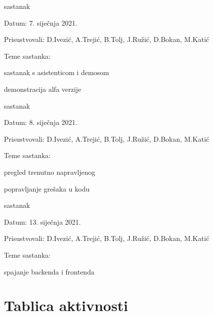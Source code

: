 \begin{packed_enum}
			\item  sastanak
			\item[] \begin{packed_item}
				\item Datum: 7. siječnja 2021.
				\item Prisustvovali: D.Ivezić, A.Trejić, B.Tolj, J.Ružić, D.Bokan, M.Katić
				\item Teme sastanka:
				\begin{packed_item}
					\item  sastanak s asistenticom i demosom
					\item  demonstracija alfa verzije
				\end{packed_item}
			\end{packed_item}
			
			\item  sastanak
			\item[] \begin{packed_item}
				\item Datum: 8. siječnja 2021.
				\item Prisustvovali: D.Ivezić, A.Trejić, B.Tolj, J.Ružić, D.Bokan, M.Katić
				\item Teme sastanka:
				\begin{packed_item}
					\item  pregled trenutno napravljenog
					\item  popravljanje grešaka u kodu
				\end{packed_item}
			\end{packed_item}
			
			\item  sastanak
			\item[] \begin{packed_item}
				\item Datum: 13. siječnja 2021.
				\item Prisustvovali: D.Ivezić, A.Trejić, B.Tolj, J.Ružić, D.Bokan, M.Katić
				\item Teme sastanka:
				\begin{packed_item}
					\item  spajanje backenda i frontenda
				\end{packed_item}
			\end{packed_item}
			
			
		\end{packed_enum}
		
		\eject
		\section*{Tablica aktivnosti}
		
